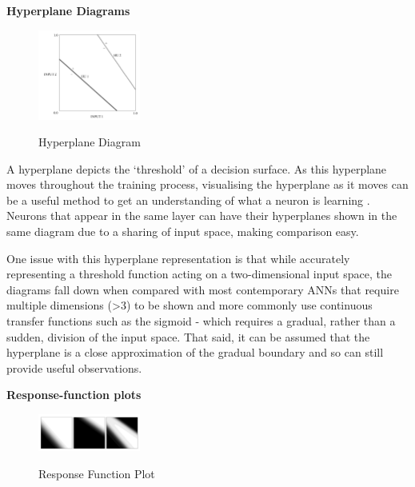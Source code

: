 \documentclass[a4paper,11pt,titlepage]{article}
\begin{document}
\textbf{Hyperplane Diagrams}
		
 	\begin{figure}[H]
    			\centering	
			{{\includegraphics[width=0.3\textwidth]
    				{img/craven_hyperplane.png} 
    			}}%
    			\caption{Hyperplane Diagram}%
    		\label{fig:bond}
	\end{figure} 
 		
		A hyperplane depicts the `threshold' of a decision surface. As this hyperplane moves throughout the training process, visualising the hyperplane as it moves can be a useful method to get an understanding of what a neuron is learning \cite{Munro1992}. Neurons that appear in the same layer can have their hyperplanes shown in the same diagram due to a sharing of input space, making comparison easy.
		\par 
		One issue with this hyperplane representation is that while accurately representing a threshold function acting on a two-dimensional input space, the diagrams fall down when compared with most contemporary ANNs that require multiple dimensions (>3) to be shown and more commonly use continuous transfer functions such as  the sigmoid - which requires a gradual, rather than a sudden, division of the input space. That said, it can be assumed that the hyperplane is a close approximation of the gradual boundary and so can still provide useful observations.
		\par 
		
\textbf{Response-function plots}
		
 	\begin{figure}[H]
    			\centering	
			{{\includegraphics[width=0.3\textwidth]
    				{img/craven_gradient.png} 
    			}}%
    			\caption{Response Function Plot}%
    		\label{fig:bond}
	\end{figure} 
 		
\end{document}
